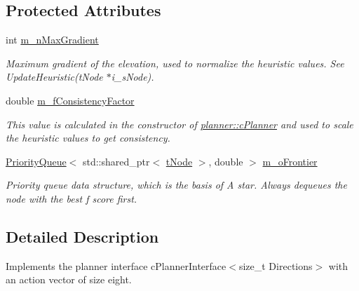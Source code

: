 \subsection*{Protected Attributes}
\begin{DoxyCompactItemize}
\item 
\mbox{\label{classplanner_1_1c_planner_af76b294d4e75b4e5d636bca4a795d2e4}} 
int \mbox{\hyperlink{classplanner_1_1c_planner_af76b294d4e75b4e5d636bca4a795d2e4}{m\+\_\+n\+Max\+Gradient}}
\begin{DoxyCompactList}\small\item\em Maximum gradient of the elevation, used to normalize the heuristic values. See Update\+Heuristic(t\+Node $\ast$i\+\_\+s\+Node). \end{DoxyCompactList}\item 
\mbox{\label{classplanner_1_1c_planner_ac9f4be1c679321a2f6bc5d1a1102b3c2}} 
double \mbox{\hyperlink{classplanner_1_1c_planner_ac9f4be1c679321a2f6bc5d1a1102b3c2}{m\+\_\+f\+Consistency\+Factor}}
\begin{DoxyCompactList}\small\item\em This value is calculated in the constructor of \mbox{\hyperlink{classplanner_1_1c_planner}{planner\+::c\+Planner}} and used to scale the heuristic values to get consistency. \end{DoxyCompactList}\item 
\mbox{\label{classplanner_1_1c_planner_a1c212bac80800ef51aacaa63fce32a2a}} 
\mbox{\hyperlink{structplanner_1_1_priority_queue}{Priority\+Queue}}$<$ std\+::shared\+\_\+ptr$<$ \mbox{\hyperlink{structplanner_1_1t_node}{t\+Node}} $>$, double $>$ \mbox{\hyperlink{classplanner_1_1c_planner_a1c212bac80800ef51aacaa63fce32a2a}{m\+\_\+o\+Frontier}}
\begin{DoxyCompactList}\small\item\em Priority queue data structure, which is the basis of A star. Always dequeues the node with the best f score first. \end{DoxyCompactList}\end{DoxyCompactItemize}


\subsection{Detailed Description}
Implements the planner interface c\+Planner\+Interface$<$size\+\_\+t Directions$>$ with an action vector of size eight. 

